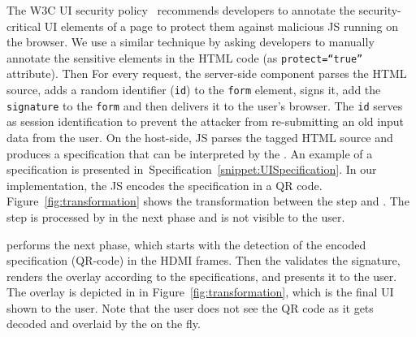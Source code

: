  The W3C UI security policy~\cite{w3c_spec} recommends developers to annotate the security-critical UI elements of a page to protect them against malicious JS running on the browser. We use a similar technique by asking developers to manually annotate the sensitive elements in the HTML code (as \texttt{protect=``true''} attribute). Then For every request, the \name server-side component parses the HTML source, adds a random identifier (\texttt{id}) to the \texttt{form} element, signs it, add the \texttt{signature} to the \texttt{form} and then delivers it to the user's browser. The \texttt{id} serves as session identification to prevent the attacker from re-submitting an old input data from the user. On the host-side, \name JS parses the tagged HTML source and produces a specification that can be interpreted by the \device.  An example of a specification is presented in~Specification~\ref{snippet:UISpecification}. In our implementation, the \name JS encodes the specification in a QR code.  Figure~\ref{fig:transformation} shows the transformation between the step \one and \two. The step \two is processed by \device in the next phase and is not visible to the user.




 \device performs the next phase, which starts with the detection of the encoded specification (QR-code) in the HDMI frames. Then the \device validates the signature, renders the overlay according to the specifications, and presents it to the user.  The \device overlay is depicted in \three in Figure~\ref{fig:transformation}, which is the final UI shown to the user. Note that the user does not see the QR code as it gets decoded and overlaid by the \device on the fly.

